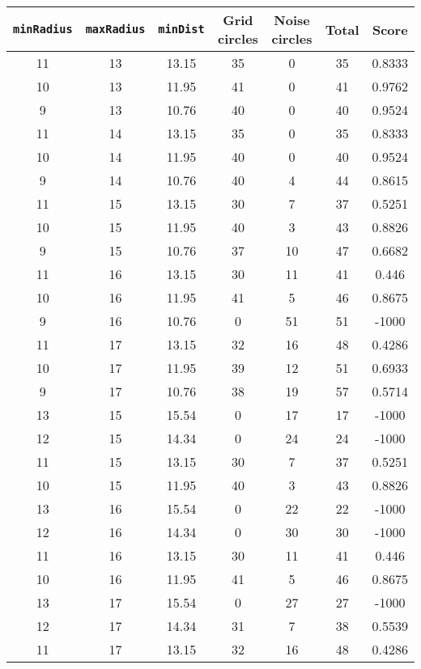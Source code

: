 \documentclass[letterpaper, 12pt]{article}
\begin{document}
\begin{longtable}{|c|c|c|c|c|c|c|}
\hline
\textbf{\texttt{minRadius}} & \textbf{\texttt{maxRadius}} & \textbf{\texttt{minDist}} & \textbf{Grid circles} & \textbf{Noise circles} & \textbf{Total} & \textbf{Score} \\
\hline
11 & 13 & 13.15 & 35 & 0 & 35 & 0.8333 \\
\hline
10 & 13 & 11.95 & 41 & 0 & 41 & 0.9762 \\
\hline
9 & 13 & 10.76 & 40 & 0 & 40 & 0.9524 \\
\hline
11 & 14 & 13.15 & 35 & 0 & 35 & 0.8333 \\
\hline
10 & 14 & 11.95 & 40 & 0 & 40 & 0.9524 \\
\hline
9 & 14 & 10.76 & 40 & 4 & 44 & 0.8615 \\
\hline
11 & 15 & 13.15 & 30 & 7 & 37 & 0.5251 \\
\hline
10 & 15 & 11.95 & 40 & 3 & 43 & 0.8826 \\
\hline
9 & 15 & 10.76 & 37 & 10 & 47 & 0.6682 \\
\hline
11 & 16 & 13.15 & 30 & 11 & 41 & 0.446 \\
\hline
10 & 16 & 11.95 & 41 & 5 & 46 & 0.8675 \\
\hline
9 & 16 & 10.76 & 0 & 51 & 51 & -1000 \\
\hline
11 & 17 & 13.15 & 32 & 16 & 48 & 0.4286 \\
\hline
10 & 17 & 11.95 & 39 & 12 & 51 & 0.6933 \\
\hline
9 & 17 & 10.76 & 38 & 19 & 57 & 0.5714 \\
\hline
13 & 15 & 15.54 & 0 & 17 & 17 & -1000 \\
\hline
12 & 15 & 14.34 & 0 & 24 & 24 & -1000 \\
\hline
11 & 15 & 13.15 & 30 & 7 & 37 & 0.5251 \\
\hline
10 & 15 & 11.95 & 40 & 3 & 43 & 0.8826 \\
\hline
13 & 16 & 15.54 & 0 & 22 & 22 & -1000 \\
\hline
12 & 16 & 14.34 & 0 & 30 & 30 & -1000 \\
\hline
11 & 16 & 13.15 & 30 & 11 & 41 & 0.446 \\
\hline
10 & 16 & 11.95 & 41 & 5 & 46 & 0.8675 \\
\hline
13 & 17 & 15.54 & 0 & 27 & 27 & -1000 \\
\hline
12 & 17 & 14.34 & 31 & 7 & 38 & 0.5539 \\
\hline
11 & 17 & 13.15 & 32 & 16 & 48 & 0.4286 \\

\end{longtable}
\end{document}
